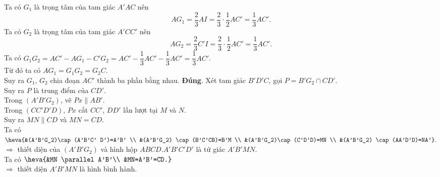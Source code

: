 \begin{ex}
{\begin{itemchoice}
\begin{center}
  \end{center}
  Ta có $G_1$ là trọng tâm của tam giác $A'AC$ nên $$AG_1=\dfrac{2}{3}AI=\dfrac{2}{3}  \cdot \dfrac{1}{2} AC'=\dfrac{1}{3}AC'.$$
  Ta có $G_2$ là trọng tâm của tam giác $A'CC'$ nên $$AG_2=\dfrac{2}{3}C' I=\dfrac{2}{3} \cdot \dfrac{1}{2}AC'=\dfrac{1}{3} AC'.$$ 
  Ta có  $G_1G_2=AC'-AG_1-C'G_2=A C'-\dfrac{1}{3}AC'-\dfrac{1}{3}AC'=\dfrac{1}{3} AC'$.\\
  Từ đó ta có  $AG_1=G_1G_2=G_2C$.\\
  Suy  ra $G_1$, $G_2$ chia đoạn $AC'$ thành ba phần bằng nhau.
   \itemch \textbf{Đúng}.
  Xét tam giác $B'D'C$, gọi $P=B'G_2 \cap  CD'$.\\
  Suy ra $P$  là trung điểm của $CD'$.\\
  Trong $(A'B'G_2)$, vẽ $Px \parallel  AB'$.\\
  Trong $(CC'D'D)$, $Px$ cắt  $CC'$, $DD'$ lần lượt tại $M$ và $N$.\\
  Suy ra $MN\parallel CD$  và $MN=CD$.\\
  Ta có $\heva{&(A'B'G_2)\cap (A'B'C'  D')=A'B' \\
  &(A'B'G_2)  \cap (B'C'CB)=B'M \\
  &(A'B'G_2)\cap (C'D'D)=MN  \\
  &(A'B'G_2)  \cap (AA'D'D)=NA'}.$\\
   $\Rightarrow$ thiết diện của $(A'B'G_2)$ và hình hộp $ABCD.A'B'C'D'$ là tứ giác $A'B'MN$.\\
  Ta có $\heva{&MN \parallel A'B'\\ &MN=A'B'=CD.}$\\ $\Rightarrow$ thiết diện $A'B'MN$  là hình bình hành.
 \end{itemchoice}
 }
\end{ex}

